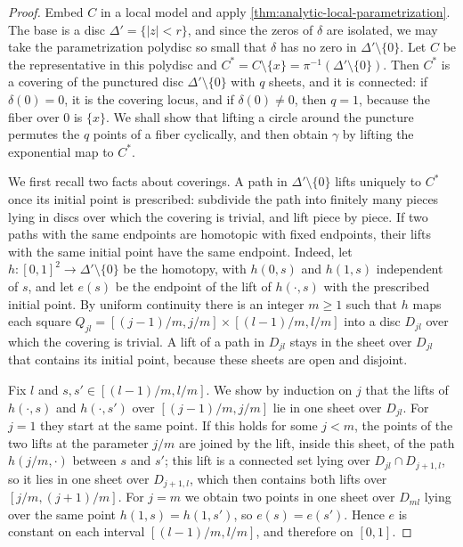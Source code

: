 \begin{proof}
Embed $C$ in a local model and apply \cref{thm:analytic-local-parametrization}. The base is a disc $\Delta'=\{|z|<r\}$, and since the zeros of $\delta$ are isolated, we may take the parametrization polydisc so small that $\delta$ has no zero in $\Delta'\setminus\{0\}$. Let $C$ be the representative in this polydisc and $C^*=C\setminus\{x\}=\pi^{-1}(\Delta'\setminus\{0\})$. Then $C^*$ is a covering of the punctured disc $\Delta'\setminus\{0\}$ with $q$ sheets, and it is connected: if $\delta(0)=0$, it is the covering locus, and if $\delta(0)\neq0$, then $q=1$, because the fiber over $0$ is $\{x\}$. We shall show that lifting a circle around the puncture permutes the $q$ points of a fiber cyclically, and then obtain $\gamma$ by lifting the exponential map to $C^*$.

We first recall two facts about coverings. A path in $\Delta'\setminus\{0\}$ lifts uniquely to $C^*$ once its initial point is prescribed: subdivide the path into finitely many pieces lying in discs over which the covering is trivial, and lift piece by piece. If two paths with the same endpoints are homotopic with fixed endpoints, their lifts with the same initial point have the same endpoint. Indeed, let $h\colon[0,1]^2\to\Delta'\setminus\{0\}$ be the homotopy, with $h(0,s)$ and $h(1,s)$ independent of $s$, and let $e(s)$ be the endpoint of the lift of $h(\cdot,s)$ with the prescribed initial point. By uniform continuity there is an integer $m\geq1$ such that $h$ maps each square $Q_{jl}=[(j-1)/m,j/m]\times[(l-1)/m,l/m]$ into a disc $D_{jl}$ over which the covering is trivial. A lift of a path in $D_{jl}$ stays in the sheet over $D_{jl}$ that contains its initial point, because these sheets are open and disjoint.

Fix $l$ and $s,s'\in[(l-1)/m,l/m]$. We show by induction on $j$ that the lifts of $h(\cdot,s)$ and $h(\cdot,s')$ over $[(j-1)/m,j/m]$ lie in one sheet over $D_{jl}$. For $j=1$ they start at the same point. If this holds for some $j<m$, the points of the two lifts at the parameter $j/m$ are joined by the lift, inside this sheet, of the path $h(j/m,\cdot)$ between $s$ and $s'$; this lift is a connected set lying over $D_{jl}\cap D_{j+1,l}$, so it lies in one sheet over $D_{j+1,l}$, which then contains both lifts over $[j/m,(j+1)/m]$. For $j=m$ we obtain two points in one sheet over $D_{ml}$ lying over the same point $h(1,s)=h(1,s')$, so $e(s)=e(s')$. Hence $e$ is constant on each interval $[(l-1)/m,l/m]$, and therefore on $[0,1]$.


\end{proof}
